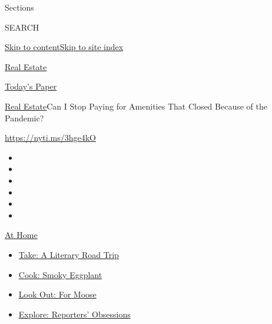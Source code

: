 Sections

SEARCH

\protect\hyperlink{site-content}{Skip to
content}\protect\hyperlink{site-index}{Skip to site index}

\href{https://www.nytimes3xbfgragh.onion/section/realestate}{Real
Estate}

\href{https://myaccount.nytimes3xbfgragh.onion/auth/login?response_type=cookie\&client_id=vi}{}

\href{https://www.nytimes3xbfgragh.onion/section/todayspaper}{Today's
Paper}

\href{/section/realestate}{Real Estate}\textbar{}Can I Stop Paying for
Amenities That Closed Because of the Pandemic?

\url{https://nyti.ms/3hge4kO}

\begin{itemize}
\item
\item
\item
\item
\item
\item
\end{itemize}

\href{https://www.nytimes3xbfgragh.onion/spotlight/at-home?action=click\&pgtype=Article\&state=default\&region=TOP_BANNER\&context=at_home_menu}{At
Home}

\begin{itemize}
\tightlist
\item
  \href{https://www.nytimes3xbfgragh.onion/2020/07/28/books/time-for-a-literary-road-trip.html?action=click\&pgtype=Article\&state=default\&region=TOP_BANNER\&context=at_home_menu}{Take:
  A Literary Road Trip}
\item
  \href{https://www.nytimes3xbfgragh.onion/2020/07/29/magazine/bored-with-your-home-cooking-some-smoky-eggplant-will-fix-that.html?action=click\&pgtype=Article\&state=default\&region=TOP_BANNER\&context=at_home_menu}{Cook:
  Smoky Eggplant}
\item
  \href{https://www.nytimes3xbfgragh.onion/2020/07/27/travel/moose-michigan-isle-royale.html?action=click\&pgtype=Article\&state=default\&region=TOP_BANNER\&context=at_home_menu}{Look
  Out: For Moose}
\item
  \href{https://www.nytimes3xbfgragh.onion/interactive/2020/at-home/even-more-reporters-editors-diaries-lists-recommendations.html?action=click\&pgtype=Article\&state=default\&region=TOP_BANNER\&context=at_home_menu}{Explore:
  Reporters' Obsessions}
\end{itemize}

